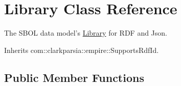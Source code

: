 \hypertarget{classorg_1_1sbolstandard_1_1lib_s_b_o_lj_1_1_library}{
\section{Library Class Reference}
\label{classorg_1_1sbolstandard_1_1lib_s_b_o_lj_1_1_library}
}


The SBOL data model's \hyperlink{classorg_1_1sbolstandard_1_1lib_s_b_o_lj_1_1_library}{Library} for RDF and Json.  




Inherits com::clarkparsia::empire::SupportsRdfId.

\subsection*{Public Member Functions}
